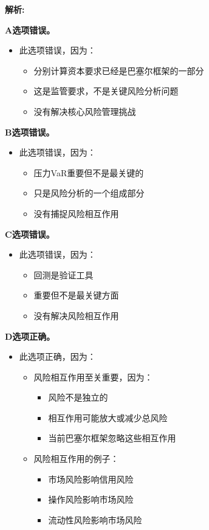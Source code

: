 \documentclass{article}
\newenvironment{explanation}
{\textbf{解析:}\par}
{\par}
\begin{document}
\begin{explanation}
    \textbf{A选项错误。}
    \begin{itemize}
        \item 此选项错误，因为：
        \begin{itemize}
            \item 分别计算资本要求已经是巴塞尔框架的一部分
            \item 这是监管要求，不是关键风险分析问题
            \item 没有解决核心风险管理挑战
        \end{itemize}
    \end{itemize}
    \textbf{B选项错误。}
    \begin{itemize}
        \item 此选项错误，因为：
        \begin{itemize}
            \item 压力VaR重要但不是最关键的
            \item 只是风险分析的一个组成部分
            \item 没有捕捉风险相互作用
        \end{itemize}
    \end{itemize}
    \textbf{C选项错误。}
    \begin{itemize}
        \item 此选项错误，因为：
        \begin{itemize}
            \item 回测是验证工具
            \item 重要但不是最关键方面
            \item 没有解决风险相互作用
        \end{itemize}
    \end{itemize}
    \textbf{D选项正确。}
    \begin{itemize}
        \item 此选项正确，因为：
        \begin{itemize}
            \item 风险相互作用至关重要，因为：
            \begin{itemize}
                \item 风险不是独立的
                \item 相互作用可能放大或减少总风险
                \item 当前巴塞尔框架忽略这些相互作用
            \end{itemize}
            \item 风险相互作用的例子：
            \begin{itemize}
                \item 市场风险影响信用风险
                \item 操作风险影响市场风险
                \item 流动性风险影响市场风险
            \end{itemize}
        \end{itemize}
    \end{itemize}
\end{explanation}
\end{document}
